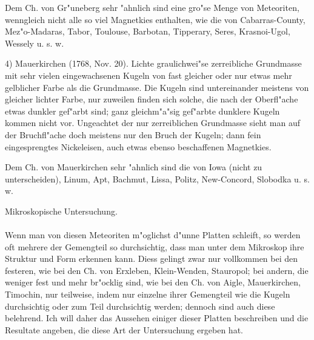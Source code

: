 \documentclass[a4paper, 11pt, oneside]{article}
\begin{document}
Dem Ch. von Gr"uneberg sehr "ahnlich sind eine gro"se Menge von Meteoriten, wenngleich nicht alle so viel Magnetkies enthalten, wie die von Cabarras-County, Mez"o-Madaras, Tabor, Toulouse, Barbotan, Tipperary, Seres, Krasnoi-Ugol, Wessely u. s. w.

4) Mauerkirchen (1768, Nov. 20). Lichte graulichwei"se zerreibliche Grundmasse mit sehr vielen eingewachsenen Kugeln von fast gleicher oder nur etwas mehr gelblicher Farbe als die Grundmasse. Die Kugeln sind untereinander meistens von gleicher lichter Farbe, nur zuweilen finden sich solche, die nach der Oberfl"ache etwas dunkler gef"arbt sind; ganz gleichm"a"sig gef"arbte dunklere Kugeln kommen nicht vor. Ungeachtet der nur zerreiblichen Grundmasse sieht man auf der Bruchfl"ache doch meistens nur den Bruch der Kugeln; dann fein eingesprengtes Nickeleisen, auch etwas ebenso beschaffenen Magnetkies.

Dem Ch. von Mauerkirchen sehr "ahnlich sind die von Iowa (nicht zu unterscheiden), Linum, Apt, Bachmut, Lissa, Politz, New-Concord, Slobodka u. s. w.
\begin{center}
Mikroskopische Untersuchung.
\end{center}
\paragraph{}
Wenn man von diesen Meteoriten m"oglichst d"unne Platten schleift, so werden oft mehrere der Gemengteil so durchsichtig, dass man unter dem Mikroskop ihre Struktur und Form erkennen kann. Diess gelingt zwar nur vollkommen bei den festeren, wie bei den Ch. von Erxleben, Klein-Wenden, Stauropol; bei andern, die weniger fest und mehr br"ocklig sind, wie bei den Ch. von Aigle, Mauerkirchen, Timochin, nur teilweise, indem nur einzelne ihrer Gemengteil wie die Kugeln durchsichtig oder zum Teil durchsichtig werden; dennoch sind auch diese belehrend. Ich will daher das Aussehen einiger dieser Platten beschreiben und die Resultate angeben, die diese Art der Untersuchung ergeben hat.
\end{document}
